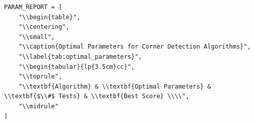 \documentclass[journal]{IEEEtran}
\begin{document}
\begin{lstlisting}[style=python, caption={Setup Parameters}, label={lst:params}]
PARAM_REPORT = [
    "\\begin{table}",
    "\\centering",
    "\\small",
    "\\caption{Optimal Parameters for Corner Detection Algorithms}",
    "\\label{tab:optimal_parameters}",
    "\\begin{tabular}{lp{3.5cm}cc}",
    "\\toprule",
    "\\textbf{Algorithm} & \\textbf{Optimal Parameters} & \\textbf{$\\#$ Tests} & \\textbf{Best Score} \\\\",
    "\\midrule"
]
\end{lstlisting}
\bigskip
\bigskip
\end{document}
